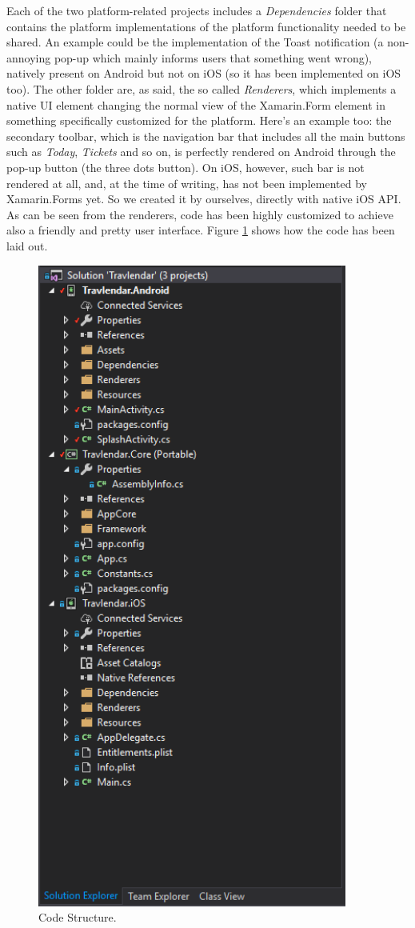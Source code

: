 Each of the two platform-related projects includes a \textit{Dependencies} folder that contains the platform implementations of the platform functionality needed to be shared. An example could be the implementation of the Toast notification (a non-annoying pop-up which mainly informs users that something went wrong), natively present on Android but not on iOS (so it has been implemented on iOS too). The other folder are, as said, the so called \textit{Renderers}, which implements a native UI element changing the normal view of the Xamarin.Form element in something specifically customized for the platform. Here's an example too: the secondary toolbar, which is the navigation bar that includes all the main buttons such as \textit{Today}, \textit{Tickets} and so on, is perfectly rendered on Android through the pop-up button (the three dots button). On iOS, however, such bar is not rendered at all, and, at the time of writing, has not been implemented by Xamarin.Forms yet. So we created it by ourselves, directly with native iOS API. As can be seen from the renderers, code has been highly customized to achieve also a friendly and pretty user interface. Figure \ref{fig:structure} shows how the code has been laid out.

\begin{figure}
	\centering
	\includegraphics[width=4in]{./images/code_structure.png}
	\caption{Code Structure.}
	\label{fig:structure}
\end{figure}


